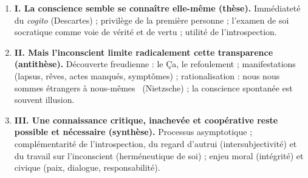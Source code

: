 \documentclass[11pt]{article}
\begin{document}
\begin{methode}
\begin{enumerate}
\item \textbf{I. La conscience semble se connaître elle-même (thèse).} Immédiateté du \emph{cogito} (Descartes) ; privilège de la première personne ; l'examen de soi socratique comme voie de vérité et de vertu ; utilité de l'introspection.
\item \textbf{II. Mais l'inconscient limite radicalement cette transparence (antithèse).} Découverte freudienne : le Ça, le refoulement ; manifestations (lapsus, rêves, actes manqués, symptômes) ; rationalisation : \guillemotleft nous nous sommes étrangers à nous-mêmes \guillemotright\ (Nietzsche) ; la conscience spontanée est souvent illusion.
\item \textbf{III. Une connaissance critique, inachevée et coopérative reste possible et nécessaire (synthèse).} Processus asymptotique ; complémentarité de l'introspection, du regard d'autrui (intersubjectivité) et du travail sur l'inconscient (herméneutique de soi) ; enjeu moral (intégrité) et civique (paix, dialogue, responsabilité).
\end{enumerate}
\end{methode}
\end{document}
